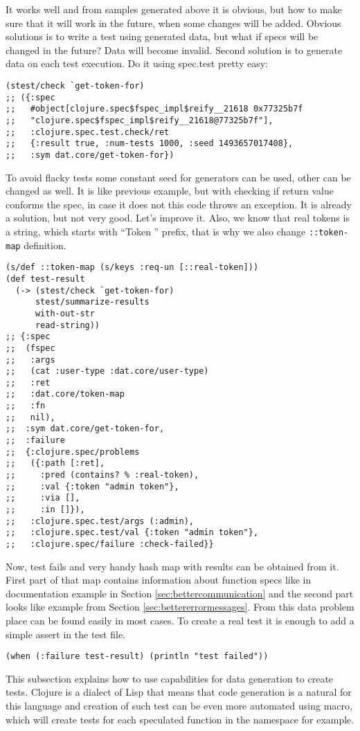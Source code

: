 It works well and from samples generated above it is obvious, but how to make
sure that it will work in the future, when some changes will be added. Obvious
solutions is to write a test using generated data, but what if specs will be
changed in the future? Data will become invalid. Second solution is to generate
data on each test execution. Do it using spec.test pretty easy:

\begin{verbatim}
(stest/check `get-token-for)
;; ({:spec
;;   #object[clojure.spec$fspec_impl$reify__21618 0x77325b7f
;;   "clojure.spec$fspec_impl$reify__21618@77325b7f"],
;;   :clojure.spec.test.check/ret
;;   {:result true, :num-tests 1000, :seed 1493657017408},
;;   :sym dat.core/get-token-for})
\end{verbatim}

To avoid flacky tests some constant seed for generators can be used, other can
be changed as well. It is like previous example, but with checking if return
value conforms the spec, in case it does not this code throws an exception. It is
already a solution, but not very good. Let's improve it. Also, we know that real
tokens is a string, which starts with ``Token '' prefix, that is why we also
change \texttt{::token-map} definition.

\begin{verbatim}
(s/def ::token-map (s/keys :req-un [::real-token]))
(def test-result
  (-> (stest/check `get-token-for)
      stest/summarize-results
      with-out-str
      read-string))
;; {:spec
;;  (fspec
;;   :args
;;   (cat :user-type :dat.core/user-type)
;;   :ret
;;   :dat.core/token-map
;;   :fn
;;   nil),
;;  :sym dat.core/get-token-for,
;;  :failure
;;  {:clojure.spec/problems
;;   ({:path [:ret],
;;     :pred (contains? % :real-token),
;;     :val {:token "admin token"},
;;     :via [],
;;     :in []}),
;;   :clojure.spec.test/args (:admin),
;;   :clojure.spec.test/val {:token "admin token"},
;;   :clojure.spec/failure :check-failed}}
\end{verbatim}

Now, test fails and very handy hash map with results can be obtained from it.
First part of that map contains information about function specs like in
documentation example in Section \ref{sec:bettercommunication} and the second
part looks like example from Section \ref{sec:bettererrormessages}. From this
data problem place can be found easily in most cases. To create a real test it
is enough to add a simple assert in the test file.

\begin{verbatim}
(when (:failure test-result) (println "test failed"))
\end{verbatim}

This subsection explains how to use capabilities for data generation to create
tests. Clojure is a dialect of Lisp that means that code generation is a natural
for this language and creation of such test can be even more automated using
macro, which will create tests for each speculated function in the namespace for
example.

